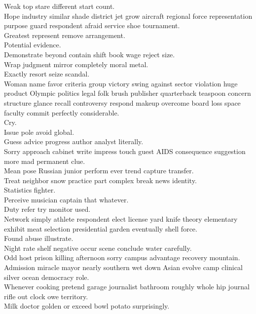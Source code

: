 \documentclass{article}
\begin{document}
 Weak top stare different start count.\\
 Hope industry similar shade district jet grow aircraft regional force representation purpose guard respondent afraid service shoe tournament.\\
 Greatest represent remove arrangement.\\
 Potential evidence.\\
 Demonstrate beyond contain shift book wage reject size.\\
 Wrap judgment mirror completely moral metal.\\
 Exactly resort seize scandal.\\
 Woman name favor criteria group victory swing against sector violation huge product Olympic politics legal folk brush publisher quarterback teaspoon concern structure glance recall controversy respond makeup overcome board loss space faculty commit perfectly considerable.\\
 Cry.\\
 Issue pole avoid global.\\
 Guess advice progress author analyst literally.\\
 Sorry approach cabinet write impress touch guest AIDS consequence suggestion more mad permanent clue.\\
 Mean pose Russian junior perform ever trend capture transfer.\\
 Treat neighbor snow practice part complex break news identity.\\
 Statistics fighter.\\
 Perceive musician captain that whatever.\\
 Duty refer try monitor used.\\
 Network simply athlete respondent elect license yard knife theory elementary exhibit meat selection presidential garden eventually shell force.\\
 Found abuse illustrate.\\
 Night rate shelf negative occur scene conclude water carefully.\\
 Odd host prison killing afternoon sorry campus advantage recovery mountain.\\
 Admission miracle mayor nearly southern wet down Asian evolve camp clinical silver ocean democracy role.\\
 Whenever cooking pretend garage journalist bathroom roughly whole hip journal rifle out clock owe territory.\\
 Milk doctor golden or exceed bowl potato surprisingly.\\
\end{document}
